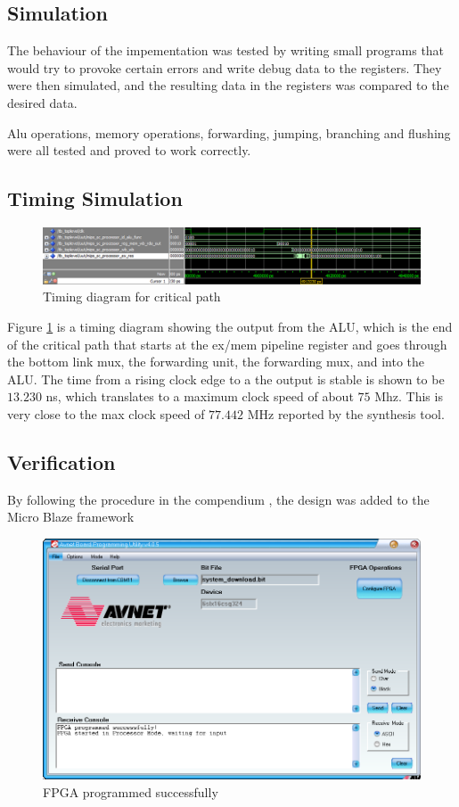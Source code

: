 \subsection{Simulation}

The behaviour of the impementation was tested by writing small programs that would try to provoke certain errors and write debug data to the registers. They were then simulated, and the resulting data in the registers was compared to the desired data.

Alu operations, memory operations, forwarding, jumping, branching and flushing were all tested and proved to work correctly.



\subsection{Timing Simulation}

\begin{figure}[ht]
    \centering
    \includegraphics[scale=0.5]{figures/TimingSimulation.png}
    \caption{Timing diagram for critical path} 
    \label{fig:timing}
\end{figure}

Figure \ref{fig:timing} is a timing diagram showing the output from the ALU, which is the end of the critical path that starts at the ex/mem pipeline register and goes through the bottom link mux, the forwarding unit, the forwarding mux, and into the ALU.
The time from a rising clock edge to a the output is stable is shown to be $13.230$ ns, which translates to a maximum clock speed of about $75$ Mhz.
This is very close to the max clock speed of $77.442$ MHz reported by the synthesis tool.

\subsection{Verification}

By following the procedure in the compendium \cite[p.47]{lab-compendium}, the design was added to the Micro Blaze framework

\begin{figure}[ht]
    \centering
    \includegraphics[scale=0.5]{figures/AVNET.png}
    \caption{FPGA programmed successfully} 
    \label{fig:avprog}
\end{figure}


